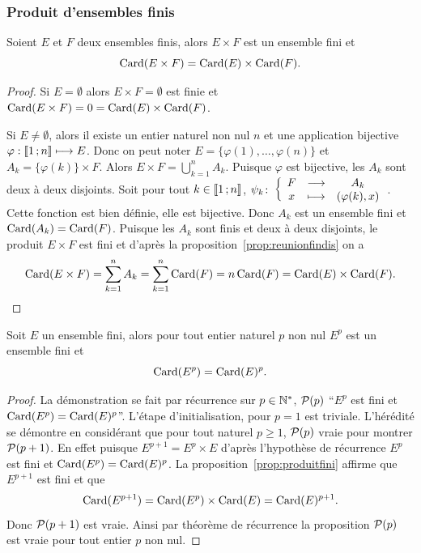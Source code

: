 \subsubsection{Produit d'ensembles finis}
\begin{prop}\label{prop:produitfini}
  Soient \(E\) et \(F\) deux ensembles finis, alors \(E\times F\) est un ensemble fini et
  \begin{equation}
    \Card(E\times F)=\Card(E)\times \Card(F).
  \end{equation}
\end{prop}
\begin{proof}
Si \(E=\emptyset\) alors \(E\times F=\emptyset\) est finie et \(\Card(E\times F)=0=\Card(E)\times \Card(F)\).
  
Si \(E\neq\emptyset\), alors il existe un entier naturel non nul \(n\) et une application bijective \(\varphi:\intervalleentier{1}{n}\longmapsto E\). Donc on peut noter \(E=\{\varphi(1),\ldots ,\varphi(n)\}\) et \(A_k=\{\varphi(k)\}\times F\). Alors \(E\times F=\bigcup_{k=1}^n A_k\). Puisque \(\varphi\) est bijective, les \(A_k\) sont deux à deux disjoints. Soit pour tout \(k\in\intervalleentier{1}{n}\), \(\fonction{\psi_k}{F}{A_k}{x}{(\varphi(k),x)}\). Cette fonction est bien définie, elle est bijective. Donc \(A_k\) est un ensemble fini et \(\Card(A_k)=\Card(F)\). Puisque les \(A_k\) sont finis et deux à deux disjoints, le produit \(E\times F\) est fini et d'après la proposition~\ref{prop:reunionfindis} on a
    \begin{equation}
      \Card(E\times F)=\sum_{k=1}^{n} A_k=\sum_{k=1}^{n}\Card(F)=n\Card(F)=\Card(E)\times \Card(F).
    \end{equation}
\end{proof}
\begin{prop}
  Soit \(E\) un ensemble fini, alors pour tout entier naturel \(p\) non nul \(E^p\) est un ensemble fini et
  \begin{equation}
    \Card(E^p)=\Card(E)^p.
  \end{equation}
\end{prop}
\begin{proof}
  La démonstration se fait par récurrence sur \(p\in\N^*\), \(\P(p)\) ``\(E^p\) est fini et \(\Card(E^p)=\Card(E)^p\)''. L'étape d'initialisation, pour \(p=1\) est triviale. L'hérédité se démontre en considérant que pour tout naturel \(p\geqslant 1\), \(\P(p)\) vraie pour montrer \(\P(p+1)\). En effet puisque \(E^{p+1}=E^p \times E\) d'après l'hypothèse de récurrence \(E^p\) est fini et \(\Card(E^p)=\Card(E)^p\). La proposition~\ref{prop:produitfini} affirme que \(E^{p+1}\) est fini et que
  \begin{equation}
    \Card(E^{p+1})=\Card(E^p)\times \Card(E)=\Card(E)^{p+1}.
  \end{equation}
  Donc \(\P(p+1)\) est vraie. Ainsi par théorème de récurrence la proposition \(\P(p)\) est vraie pour tout entier \(p\) non nul.
\end{proof}

